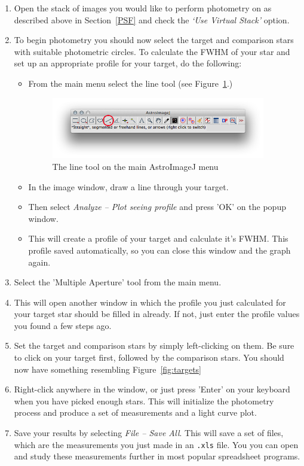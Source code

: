 \documentclass[12pt,twoside,a4paper]{report}
\begin{document}
\begin{enumerate}
 \item Open the stack of images you would like to perform photometry on as described above in Section~\ref{PSF} and check the \emph{`Use Virtual Stack'} option.
 \item To begin photometry you should now select the target and comparison stars with suitable photometric circles. To calculate the FWHM of your star and set up an appropriate profile for your target, do the following:

  \begin{itemize}
   \item From the main menu select the line tool (see Figure~\ref{fig:linetool}.)

  \begin{figure}[ht]
  \centering
    \includegraphics[width=0.94\textwidth]{documentation_images/AIJlinetool.jpg}
    \caption{\label{fig:linetool}The line tool on the main AstroImageJ menu}
 \end{figure}

   \item In the image window, draw a line through your target.
   \item Then select \emph{Analyze -- Plot seeing profile} and press 'OK' on the popup window.
   \item This will create a profile of your target and calculate it's FWHM. This profile saved automatically, so you can close this window and the graph again.
  \end{itemize}

 \item Select the 'Multiple Aperture' tool from the main menu.
 \item This will open another window in which the profile you just calculated for your target star should be filled in already. If not, just enter the profile values you found a few steps ago.
 \item Set the target and comparison stars by simply left-clicking on them. Be sure to click on your target first, followed by the comparison stars. You should now have something resembling Figure~\ref{fig:targets}
 \item Right-click anywhere in the window, or just press 'Enter' on your keyboard when you have picked enough stars. This will initialize the photometry process and produce a set of measurements and a light curve plot.
 \item Save your results by selecting \emph{File -- Save All}. This will save a set of files, which are the measurements you just made in an {\tt .xls} file. You you can open and study these measurements further in most popular spreadsheet programs.


\end{enumerate}
\end{document}
